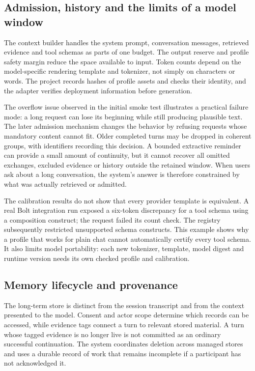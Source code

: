 \documentclass[11pt]{article}
\begin{document}
\subsection{Admission, history and the limits of a model window}
The context builder handles the system prompt, conversation messages, retrieved evidence and tool schemas as parts of one budget. The output reserve and profile safety margin reduce the space available to input. Token counts depend on the model-specific rendering template and tokenizer, not simply on characters or words. The project records hashes of profile assets and checks their identity, and the adapter verifies deployment information before generation.

The overflow issue observed in the initial smoke test illustrates a practical failure mode: a long request can lose its beginning while still producing plausible text. The later admission mechanism changes the behavior by refusing requests whose mandatory content cannot fit. Older completed turns may be dropped in coherent groups, with identifiers recording this decision. A bounded extractive reminder can provide a small amount of continuity, but it cannot recover all omitted exchanges, excluded evidence or history outside the retained window. When users ask about a long conversation, the system's answer is therefore constrained by what was actually retrieved or admitted.

The calibration results do not show that every provider template is equivalent. A real Bolt integration run exposed a six-token discrepancy for a tool schema using a composition construct; the request failed its count check. The registry subsequently restricted unsupported schema constructs. This example shows why a profile that works for plain chat cannot automatically certify every tool schema. It also limits model portability: each new tokenizer, template, model digest and runtime version needs its own checked profile and calibration.

\subsection{Memory lifecycle and provenance}
The long-term store is distinct from the session transcript and from the context presented to the model. Consent and actor scope determine which records can be accessed, while evidence tags connect a turn to relevant stored material. A turn whose tagged evidence is no longer live is not committed as an ordinary successful continuation. The system coordinates deletion across managed stores and uses a durable record of work that remains incomplete if a participant has not acknowledged it.
\end{document}

